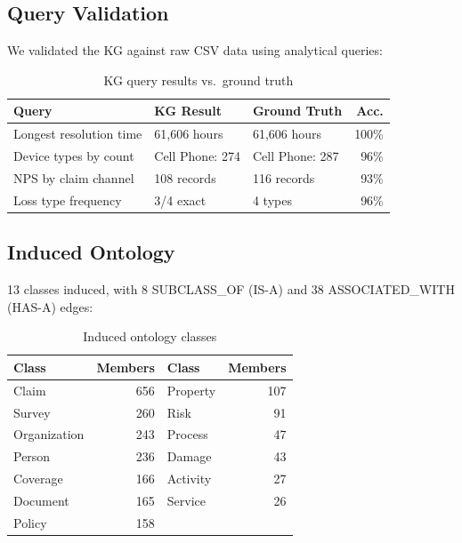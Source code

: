 \documentclass[11pt]{article}
\begin{document}
\subsection{Query Validation}

We validated the KG against raw CSV data using analytical queries:

\begin{table}[h]
\centering
\caption{KG query results vs.\ ground truth}
\begin{tabular}{lp{3cm}p{3cm}r}
\toprule
\textbf{Query} & \textbf{KG Result} & \textbf{Ground Truth} & \textbf{Acc.} \\
\midrule
Longest resolution time & 61,606 hours & 61,606 hours & 100\% \\
Device types by count & Cell Phone: 274 & Cell Phone: 287 & 96\% \\
NPS by claim channel & 108 records & 116 records & 93\% \\
Loss type frequency & 3/4 exact & 4 types & 96\% \\
\bottomrule
\end{tabular}
\end{table}

\subsection{Induced Ontology}

13 classes induced, with 8 SUBCLASS\_OF (IS-A) and 38 ASSOCIATED\_WITH (HAS-A) edges:

\begin{table}[h]
\centering
\caption{Induced ontology classes}
\begin{tabular}{lr|lr}
\toprule
\textbf{Class} & \textbf{Members} & \textbf{Class} & \textbf{Members} \\
\midrule
Claim & 656 & Property & 107 \\
Survey & 260 & Risk & 91 \\
Organization & 243 & Process & 47 \\
Person & 236 & Damage & 43 \\
Coverage & 166 & Activity & 27 \\
Document & 165 & Service & 26 \\
Policy & 158 & & \\
\bottomrule
\end{tabular}
\end{table}
\end{document}
